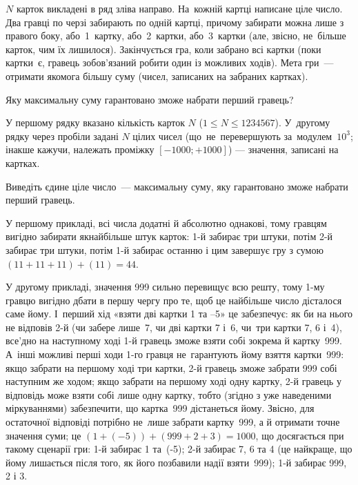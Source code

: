 ﻿$N$ карток викладені в ряд зліва направо. На~кожній картці написане ціле число. Два гравці по черзі забирають по одній картці, причому забирати можна лише з правого боку, або~1~картку, або~2~картки, або~3~картки (але, звісно, не~більше карток, чим їх лишилося). Закінчується гра, коли забрано всі картки (поки картки~є, гравець зобов'язаний робити один із можливих ходів). Мета гри~--- отримати якомога більшу суму (чисел, записаних на забраних картках).

Яку максимальну суму гарантовано зможе набрати перший гравець?


\InputFile

У першому рядку вказано кількість карток $N$ ($1\leqslant N\leqslant 1234567$). У~другому рядку через пробіли задані $N$ цілих чисел (що~не~перевершують за~модулем~$10^3$; інакше кажучи, належать проміжку $[-1000; +1000]$) --- значення, записані на картках.


\OutputFile

Виведіть єдине ціле число~--- максимальну суму, яку гарантовано зможе набрати перший гравець.


\Examples

\begin{example}
%
%
\end{example}

\Note

У першому прикладі, всі числа додатні й абсолютно однакові, тому гравцям вигідно забирати якнайбільше штук карток: 1-й забирає три штуки, потім 2-й забирає три штуки, потім 1-й забирає останню і цим завершує гру з сумою $(11+11+11)+(11)=44$.

У др{\it у}гому прикладі, значення 999 сильно перевищує всю решту, тому 1-му гравцю вигідно дбати в першу чергу про те, щоб це найбільше число дісталося саме йому.
І~перший хід «взяти дві картки 1 та –5» це забезпечує: як би на нього не відповів 2-й (чи забере лише~7, чи дві картки 7 і~6, чи~три картки 7, 6 і~4), все'дно на наступному ході 1-й гравець зможе взяти собі зокрема й картку~999. А~інші можливі перші ходи 1-го гравця не~гарантують йому взяття картки~999: якщо забрати на першому ході три картки, 2-й гравець зможе забрати 999 собі наступним же ходом; якщо забрати на першому ході одну картку, 2-й гравець у відповідь може взяти собі лише одну картку, тобто (згідно з уже наведеними міркуваннями) забезпечити, що картка~999 дістанеться йому. Звісно, для остат{\it о}чної відповіді потрібно не~лише забрати картку~999, а й отримати точне значення суми; це $(1+(-5))+(999+2+3)=1000$, що досягається при такому сценарії гри: 1-й забирає 1 та~(-5); 2-й забирає 7, 6 та 4 (це найкраще, що йому лишається після того, як його позбавили надії взяти~999); 1-й забирає 999, 2 і 3.

